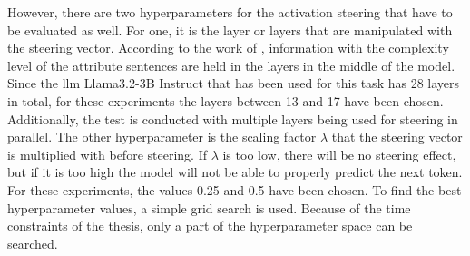 However, there are two hyperparameters for the activation steering that have to be evaluated as well. For one, it is the layer or layers that are manipulated with the steering vector. According to the work of \citet{konenStyleVectorsSteering2024,bogdanEmergentEffectsScaling2025}, information with the complexity level of the attribute sentences are held in the layers in the middle of the model. Since the \ac{llm} Llama3.2-3B Instruct that has been used for this task has \num{28} layers in total, for these experiments the layers between \num{13} and \num{17} have been chosen. Additionally, the test is conducted with multiple layers being used for steering in parallel.
The other hyperparameter is the scaling factor \(\lambda\) that the steering vector is multiplied with before steering. If \(\lambda\) is too low, there will be no steering effect, but if it is too high the model will not be able to properly predict the next token. For these experiments, the values \num{0.25} and \num{0.5} have been chosen.
To find the best hyperparameter values, a simple grid search is used. Because of the time constraints of the thesis, only a part of the hyperparameter space can be searched.
